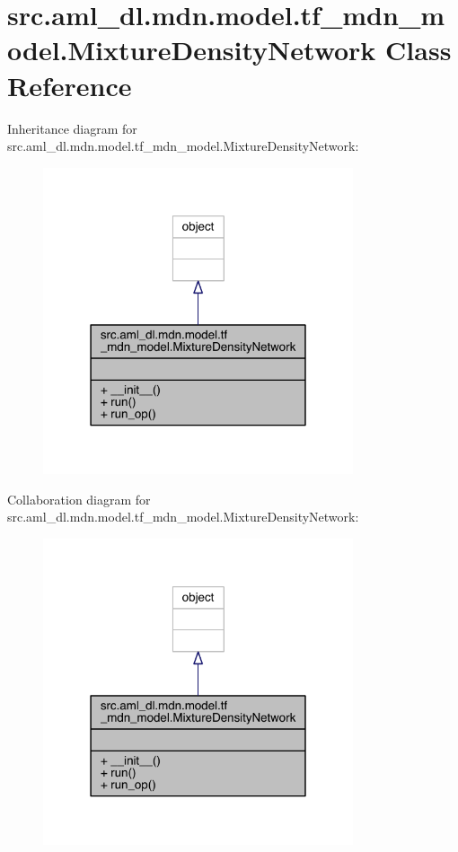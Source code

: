 \hypertarget{classsrc_1_1aml__dl_1_1mdn_1_1model_1_1tf__mdn__model_1_1_mixture_density_network}{}\section{src.\+aml\+\_\+dl.\+mdn.\+model.\+tf\+\_\+mdn\+\_\+model.\+Mixture\+Density\+Network Class Reference}
\label{classsrc_1_1aml__dl_1_1mdn_1_1model_1_1tf__mdn__model_1_1_mixture_density_network}


Inheritance diagram for src.\+aml\+\_\+dl.\+mdn.\+model.\+tf\+\_\+mdn\+\_\+model.\+Mixture\+Density\+Network\+:
\nopagebreak
\begin{figure}[H]
\begin{center}
\leavevmode
\includegraphics[width=259pt]{classsrc_1_1aml__dl_1_1mdn_1_1model_1_1tf__mdn__model_1_1_mixture_density_network__inherit__graph}
\end{center}
\end{figure}


Collaboration diagram for src.\+aml\+\_\+dl.\+mdn.\+model.\+tf\+\_\+mdn\+\_\+model.\+Mixture\+Density\+Network\+:
\nopagebreak
\begin{figure}[H]
\begin{center}
\leavevmode
\includegraphics[width=259pt]{classsrc_1_1aml__dl_1_1mdn_1_1model_1_1tf__mdn__model_1_1_mixture_density_network__coll__graph}
\end{center}
\end{figure}
